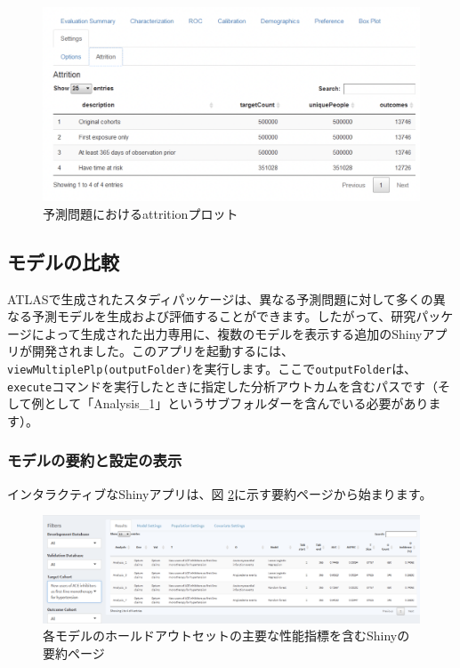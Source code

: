 \documentclass[
  11pt]{book}
\theoremstyle{definition}
\theoremstyle{definition}
\theoremstyle{definition}
\theoremstyle{definition}
\theoremstyle{remark}
\begin{document}
\begin{figure}

{\centering \includegraphics[width=1\linewidth]{images/PatientLevelPrediction/shiny/singleShiny/singleShinyAtt} 

}

\caption{予測問題におけるattritionプロット}\label{fig:shinyAtt}
\end{figure}

\subsection{モデルの比較}\label{ux30e2ux30c7ux30ebux306eux6bd4ux8f03}

ATLASで生成されたスタディパッケージは、異なる予測問題に対して多くの異なる予測モデルを生成および評価することができます。したがって、研究パッケージによって生成された出力専用に、複数のモデルを表示する追加のShinyアプリが開発されました。このアプリを起動するには、\texttt{viewMultiplePlp(outputFolder)}を実行します。ここで\texttt{outputFolder}は、\texttt{execute}コマンドを実行したときに指定した分析アウトカムを含むパスです（そして例として「Analysis\_1」というサブフォルダーを含んでいる必要があります）。

\subsubsection*{モデルの要約と設定の表示}\label{ux30e2ux30c7ux30ebux306eux8981ux7d04ux3068ux8a2dux5b9aux306eux8868ux793a}

インタラクティブなShinyアプリは、図 \ref{fig:multiShinySummary}に示す要約ページから始まります。

\begin{figure}

{\centering \includegraphics[width=1\linewidth]{images/PatientLevelPrediction/shiny/shinyFilter} 

}

\caption{各モデルのホールドアウトセットの主要な性能指標を含むShinyの要約ページ}\label{fig:multiShinySummary}
\end{figure}
\end{document}
